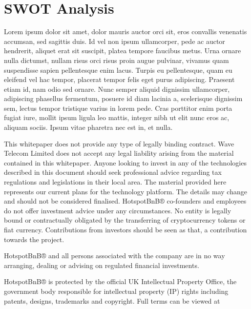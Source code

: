 \documentclass[letterpaper,10pt,openany,oneside,english]{sphinxmanual}
\begin{document}
\section{SWOT Analysis}
\label{\detokenize{swotanalysis:swot-analysis}}\label{\detokenize{swotanalysis::doc}}
Lorem ipsum dolor sit amet, dolor mauris auctor orci sit, eros convallis venenatis accumsan, sed sagittis duis. Id vel non ipsum ullamcorper, pede ac auctor hendrerit, aliquet erat sit suscipit, platea tempore faucibus metus. Urna ornare nulla dictumst, nullam risus orci risus proin augue pulvinar, vivamus quam suspendisse sapien pellentesque enim lacus. Turpis eu pellentesque, quam eu eleifend vel hac tempor, placerat tempor felis eget purus adipiscing. Praesent etiam id, nam odio sed ornare. Nunc semper aliquid dignissim ullamcorper, adipiscing phasellus fermentum, posuere id diam lacinia a, scelerisque dignissim sem, lectus tempor tristique varius in lorem pede. Cras porttitor enim porta fugiat iure, mollit ipsum ligula leo mattis, integer nibh ut elit nunc eros ac, aliquam sociis. Ipsum vitae pharetra nec est in, et nulla.

This whitepaper does not provide any type of legally binding contract. Wave Telecom Limited does not accept any legal liability arising from the material contained in this whitepaper. Anyone looking to invest in any of the technologies described in this document should seek professional advice regarding tax regulations and legislations in their local area. The material provided here represents our current plans for the technology platform. The details may change and should not be considered finalised. HotspotBnB® co-founders and employees do not offer investment advice under any circumstances. No entity is legally bound or contractually obligated by the transferring of cryptocurrency tokens or fiat currency. Contributions from investors should be seen as that, a contribution towards the project.

HotspotBnB® and all persons associated with the company are in no way arranging, dealing or advising on regulated financial investments.

HotspotBnB® is protected by the official UK Intellectual Property Office, the government body responsible for intellectual property (IP) rights including patents, designs, trademarks and copyright. Full terms can be viewed at 


\section{}
\label{\detokenize{index:document-author-s}}



\renewcommand{\indexname}{Index}
\printindex
\end{document}
